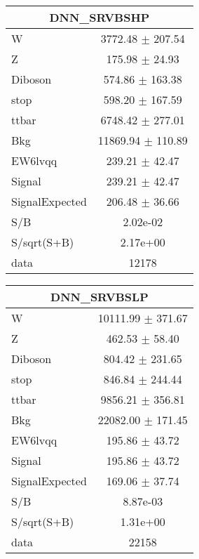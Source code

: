 \begin{table}
\centering
\small
\begin{tabular}{|l|c|}
\hline
 \multicolumn{2}{|c|}{DNN\_SRVBSHP}\\ \hline
W & 3772.48 $\pm$ 207.54\\
Z & 175.98 $\pm$ 24.93\\
Diboson & 574.86 $\pm$ 163.38\\
stop & 598.20 $\pm$ 167.59\\
ttbar & 6748.42 $\pm$ 277.01\\
\hline
Bkg & 11869.94 $\pm$ 110.89\\
\hline
EW6lvqq & 239.21 $\pm$ 42.47\\
\hline
Signal & 239.21 $\pm$ 42.47\\
SignalExpected & 206.48 $\pm$ 36.66\\
\hline
S/B & 2.02e-02\\
S/sqrt(S+B) & 2.17e+00\\
\hline
data & 12178\\ \hline
\end{tabular}
\begin{tabular}{|l|c|}
\hline
 \multicolumn{2}{|c|}{DNN\_SRVBSLP}\\ \hline
W & 10111.99 $\pm$ 371.67\\
Z & 462.53 $\pm$ 58.40\\
Diboson & 804.42 $\pm$ 231.65\\
stop & 846.84 $\pm$ 244.44\\
ttbar & 9856.21 $\pm$ 356.81\\
\hline
Bkg & 22082.00 $\pm$ 171.45\\
\hline
EW6lvqq & 195.86 $\pm$ 43.72\\
\hline
Signal & 195.86 $\pm$ 43.72\\
SignalExpected & 169.06 $\pm$ 37.74\\
\hline
S/B & 8.87e-03\\
S/sqrt(S+B) & 1.31e+00\\
\hline
data & 22158\\ \hline
\end{tabular}

\end{table}

